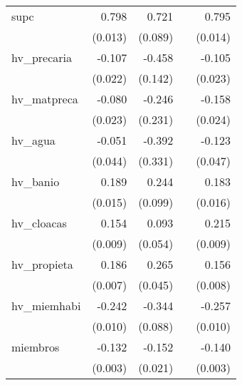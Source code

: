{\begin{longtable}{l*{4}{D{.}{.}{-1}}}
\addlinespace
supc        &       0.798\sym{***}&       0.721\sym{***}&                     &       0.795\sym{***}\\
            &     (0.013)         &     (0.089)         &                     &     (0.014)         \\
\addlinespace
hv\_precaria &      -0.107\sym{***}&      -0.458\sym{**} &                     &      -0.105\sym{***}\\
            &     (0.022)         &     (0.142)         &                     &     (0.023)         \\
\addlinespace
hv\_matpreca &      -0.080\sym{***}&      -0.246         &                     &      -0.158\sym{***}\\
            &     (0.023)         &     (0.231)         &                     &     (0.024)         \\
\addlinespace
hv\_agua     &      -0.051         &      -0.392         &                     &      -0.123\sym{**} \\
            &     (0.044)         &     (0.331)         &                     &     (0.047)         \\
\addlinespace
hv\_banio    &       0.189\sym{***}&       0.244\sym{*}  &                     &       0.183\sym{***}\\
            &     (0.015)         &     (0.099)         &                     &     (0.016)         \\
\addlinespace
hv\_cloacas  &       0.154\sym{***}&       0.093         &                     &       0.215\sym{***}\\
            &     (0.009)         &     (0.054)         &                     &     (0.009)         \\
\addlinespace
hv\_propieta &       0.186\sym{***}&       0.265\sym{***}&                     &       0.156\sym{***}\\
            &     (0.007)         &     (0.045)         &                     &     (0.008)         \\
\addlinespace
hv\_miemhabi &      -0.242\sym{***}&      -0.344\sym{***}&                     &      -0.257\sym{***}\\
            &     (0.010)         &     (0.088)         &                     &     (0.010)         \\
\addlinespace
miembros    &      -0.132\sym{***}&      -0.152\sym{***}&                     &      -0.140\sym{***}\\
            &     (0.003)         &     (0.021)         &                     &     (0.003)         \\

\end{longtable}}
